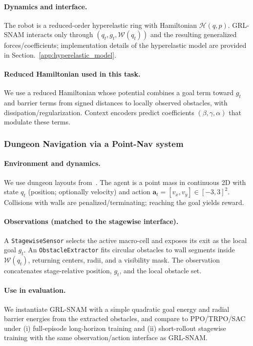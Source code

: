 \paragraph{Dynamics and interface.}
The robot is a reduced-order hyperelastic ring with Hamiltonian $\mathcal{H}(q,p)$. GRL-SNAM interacts only through $(q_t, g_t, \mathcal{W}(q_t))$ and the resulting generalized forces/coefficients; implementation details of the hyperelastic model are provided in Section.~\ref{app:hyperelastic_model}.

\paragraph{Reduced Hamiltonian used in this task.}
We use a reduced Hamiltonian whose potential combines a goal term toward $g_t$ and barrier terms from signed distances to locally observed obstacles, with dissipation/regularization. Context encoders predict coefficients $(\beta,\gamma,\alpha)$ that modulate these terms.

\subsubsection{ Dungeon Navigation via a Point-Nav system }
\label{subsubsec:dungeon_task}

\paragraph{Environment and dynamics.}
We use dungeon layouts from~\citet{liang2023context}. The agent is a point mass in continuous 2D with state $q_t$ (position; optionally velocity) and action $\mathbf{a}_t=[v_x,v_y]\in[-3,3]^2$. Collisions with walls are penalized/terminating; reaching the goal yields reward.

\paragraph{Observations (matched to the stagewise interface).}
A \texttt{StagewiseSensor} selects the active macro-cell and exposes its exit as the local goal $g_t$. An \texttt{ObstacleExtractor} fits circular obstacles to wall segments inside $\mathcal{W}(q_t)$, returning centers, radii, and a visibility mask. The observation concatenates stage-relative position, $g_t$, and the local obstacle set.

\paragraph{Use in evaluation.}
We instantiate GRL-SNAM with a simple quadratic goal energy and radial barrier energies from the extracted obstacles, and compare to PPO/TRPO/SAC under (i) full-episode long-horizon training and (ii) short-rollout stagewise training with the same observation/action interface as GRL-SNAM.

